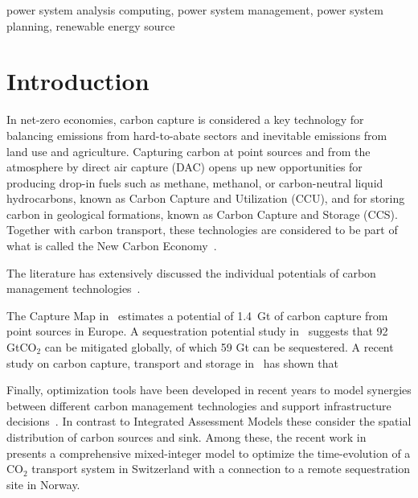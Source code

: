 \documentclass[conference]{IEEEtran}
\begin{document}
\begin{IEEEkeywords}
    power system analysis computing, power system management, power system planning, renewable energy source
\end{IEEEkeywords}


\section{Introduction}
\label{sec:introduction}

In net-zero economies, carbon capture is considered a key technology for balancing emissions from hard-to-abate sectors and inevitable emissions from land use and agriculture. Capturing carbon at point sources and from the atmosphere by direct air capture (DAC) opens up new opportunities for producing drop-in fuels such as methane, methanol, or carbon-neutral liquid hydrocarbons, known as Carbon Capture and Utilization (CCU), and for storing carbon in geological formations, known as Carbon Capture and Storage (CCS). Together with carbon transport, these technologies are considered to be part of what is called the New Carbon Economy~\cite{arniehellerNewCarbonEconomy2019}.

The literature has extensively discussed the individual potentials of carbon management technologies~\cite{burandtDecarbonizingChinaEnergy2019,caprosEnergysystemModellingEU2019,damoreOptimalDesignEuropean2021,larsonNetZeroAmericaPotential2021,maModelingOptimizationCombined2021,mikulcicFlexibleCarbonCapture2019,williamsCarbonNeutralPathwaysUnited2021}.


The Capture Map in~\cite{ToolsGreenTransition} estimates a potential of 1.4~Gt of carbon capture from point sources in Europe. A sequestration potential study in~\cite{weiProposedGlobalLayout2021} suggests that 92 GtCO$_2$ can be mitigated globally, of which 59 Gt can be sequestered. A recent study on carbon capture, transport and storage in~\cite{CaptureMapGetSitespecific} has shown that

Finally, optimization tools have been developed in recent years to model synergies between different carbon management technologies and support infrastructure decisions~\cite{bakkenLinearModelsOptimization2008,morbeeOptimisedDeploymentEuropean2012,oeiModelingCarbonCapture2014,elahiMultiperiodLeastCost2014,middletonSimCCSOpensourceTool2020,bjerketvedtOptimalDesignCost2020,weiProposedGlobalLayout2021,damoreOptimalDesignEuropean2021,becattiniCarbonDioxideCapture2022}. In contrast to Integrated Assessment Models these consider the spatial distribution of carbon sources and sink. Among these, the recent work in~\cite{becattiniCarbonDioxideCapture2022} presents a comprehensive mixed-integer model to optimize the time-evolution of a CO$_2$ transport system in Switzerland with a connection to a remote sequestration site in Norway.
\end{document}
